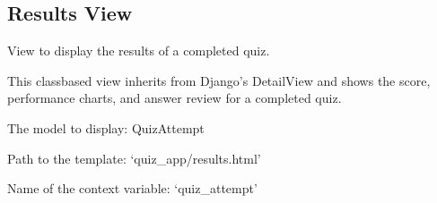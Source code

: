 \documentclass[letterpaper,10pt,english]{sphinxmanual}
\begin{document}
\subsection{Results View}
\label{\detokenize{views:results-view}}

\begin{fulllineitems}
\label{\detokenize{views:ResultsView}}
\pysigstartsignatures
\pysigline
{}
\pysigstopsignatures
\sphinxAtStartPar
View to display the results of a completed quiz.

\sphinxAtStartPar
This class\sphinxhyphen{}based view inherits from Django’s DetailView and shows
the score, performance charts, and answer review for a completed quiz.

\begin{fulllineitems}
\label{\detokenize{views:ResultsView.model}}
\pysigstartsignatures
\pysigline
{}
\pysigstopsignatures
\sphinxAtStartPar
The model to display: QuizAttempt

\end{fulllineitems}


\begin{fulllineitems}
\label{\detokenize{views:ResultsView.template_name}}
\pysigstartsignatures
\pysigline
{}
\pysigstopsignatures
\sphinxAtStartPar
Path to the template: ‘quiz\_app/results.html’

\end{fulllineitems}


\begin{fulllineitems}
\label{\detokenize{views:ResultsView.context_object_name}}
\pysigstartsignatures
\pysigline
{}
\pysigstopsignatures
\sphinxAtStartPar
Name of the context variable: ‘quiz\_attempt’


\end{fulllineitems}
\end{fulllineitems}
\end{document}
